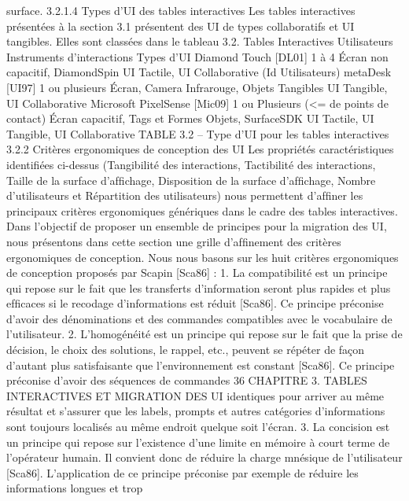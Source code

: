\documentclass{article}
\begin{document}
surface.
3.2.1.4
Types d’UI des tables interactives
Les tables interactives pr\'{e}sent\'{e}es \`{a} la section 3.1 pr\'{e}sentent des UI de types collaboratifs et UI
tangibles. Elles sont class\'{e}es dans le tableau 3.2.
Tables Interactives
Utilisateurs
Instruments
d’interactions
Types d’UI
Diamond
Touch [DL01]
1 \`{a} 4
Écran non capacitif,
DiamondSpin
UI Tactile, UI
Collaborative (Id
Utilisateurs)
metaDesk [UI97]
1 ou plusieurs
Écran, Camera
Infrarouge, Objets
Tangibles
UI Tangible, UI
Collaborative
Microsoft PixelSense
[Mic09]
1 ou Plusieurs (<= de
points de contact)
Écran capacitif, Tags et
Formes Objets,
SurfaceSDK
UI Tactile, UI
Tangible, UI
Collaborative
TABLE 3.2 – Type d’UI pour les tables interactives
3.2.2
Crit\`{e}res ergonomiques de conception des UI
Les propri\'{e}t\'{e}s caract\'{e}ristiques identiﬁ\'{e}es ci-dessus (Tangibilit\'{e} des interactions, Tactibilit\'{e} des
interactions, Taille de la surface d’afﬁchage, Disposition de la surface d’afﬁchage, Nombre d’utilisateurs et R\'{e}partition des utilisateurs) nous permettent d’afﬁner les principaux crit\`{e}res ergonomiques
g\'{e}n\'{e}riques dans le cadre des tables interactives. Dans l’objectif de proposer un ensemble de principes
pour la migration des UI, nous pr\'{e}sentons dans cette section une grille d’afﬁnement des crit\`{e}res ergonomiques de conception. Nous nous basons sur les huit crit\`{e}res ergonomiques de conception propos\'{e}s
par Scapin [Sca86] :
1. La compatibilit\'{e} est un principe qui repose sur le fait que les transferts d’information seront
plus rapides et plus efﬁcaces si le recodage d’informations est r\'{e}duit [Sca86]. Ce principe pr\'{e}conise d’avoir des d\'{e}nominations et des commandes compatibles avec le vocabulaire de l’utilisateur.
2. L’homog\'{e}n\'{e}it\'{e} est un principe qui repose sur le fait que la prise de d\'{e}cision, le choix des
solutions, le rappel, etc., peuvent se r\'{e}p\'{e}ter de fa\c{c}on d’autant plus satisfaisante que l’environnement est constant [Sca86]. Ce principe pr\'{e}conise d’avoir des s\'{e}quences de commandes
36
CHAPITRE 3. TABLES INTERACTIVES ET MIGRATION DES UI
identiques pour arriver au m\^{e}me r\'{e}sultat et s’assurer que les labels, prompts et autres cat\'{e}gories
d’informations sont toujours localis\'{e}s au m\^{e}me endroit quelque soit l’\'{e}cran.
3. La concision est un principe qui repose sur l’existence d’une limite en m\'{e}moire \`{a} court terme
de l’op\'{e}rateur humain. Il convient donc de r\'{e}duire la charge mn\'{e}sique de l’utilisateur [Sca86].
L’application de ce principe pr\'{e}conise par exemple de r\'{e}duire les informations longues et trop
\end{document}
